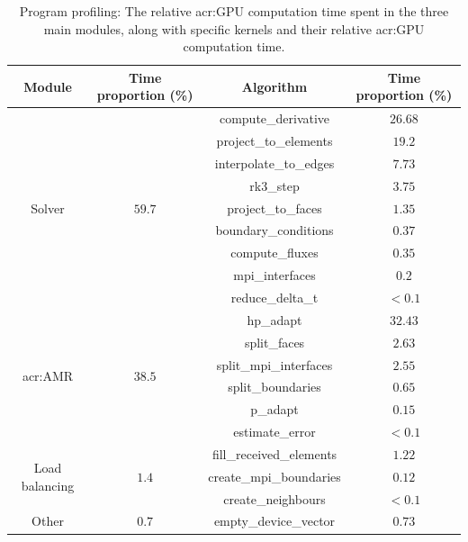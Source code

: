 \begin{table}[H]
    \centering
    \begin{tabular}{ c c c c }
        Module & Time proportion (\%) & Algorithm & Time proportion (\%) \\
        \toprule
        \multirow{9}{*}{Solver} & \multirow{9}{*}{\(59.7\)} & compute\_derivative & \(26.68\) \\
                                                          & & project\_to\_elements & \(19.2\) \\
                                                          & & interpolate\_to\_edges & \(7.73\) \\
                                                          & & rk3\_step & \(3.75\) \\
                                                          & & project\_to\_faces & \(1.35\) \\
                                                          & & boundary\_conditions & \(0.37\) \\
                                                          & & compute\_fluxes & \(0.35\) \\
                                                          & & mpi\_interfaces & \(0.2\) \\
                                                          & & reduce\_delta\_t & \(<0.1\) \\
        \midrule
        \multirow{6}{*}{\Acrshort{acr:AMR}} & \multirow{6}{*}{\(38.5\)} & hp\_adapt & \(32.43\) \\
                                                                      & & split\_faces & \(2.63\) \\
                                                                      & & split\_mpi\_interfaces & \(2.55\) \\
                                                                      & & split\_boundaries & \(0.65\) \\
                                                                      & & p\_adapt & \(0.15\) \\
                                                                      & & estimate\_error & \(<0.1\) \\
        \midrule
        \multirow{3}{*}{Load balancing} & \multirow{3}{*}{\(1.4\)} & fill\_received\_elements & \(1.22\) \\
                                                                 & & create\_mpi\_boundaries & \(0.12\) \\
                                                                 & & create\_neighbours & \(<0.1\) \\
        \midrule
        \multirow{1}{*}{Other} & \multirow{1}{*}{\(0.7\)} & empty\_device\_vector & \(0.73\) \\
    \end{tabular}
    \caption{Program profiling: The relative \acrshort{acr:GPU} computation time spent in the three main modules, along with specific kernels and their relative \acrshort{acr:GPU} computation time.}\label{table:profiling}
\end{table}

